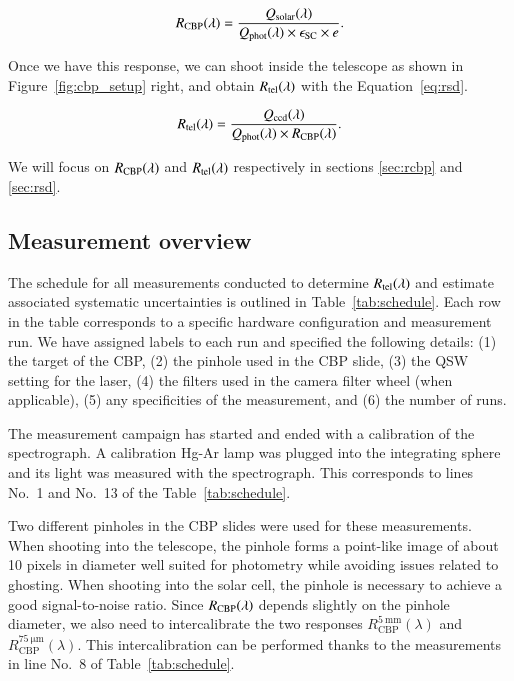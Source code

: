 \begin{equation}
    R_{\mathrm{CBP}}(\lambda) = \frac{Q_{\mathrm{solar}}(\lambda)}{Q_{\mathrm{phot}}(\lambda) \times \epsilon_{\mathrm{SC}} \times e}.
    \label{eq:rcbp}
\end{equation} 

Once we have this response, we can shoot inside the \SD telescope as shown in Figure~\ref{fig:cbp_setup} right, and obtain $R_{\mathrm{tel}}(\lambda)$ with the Equation~\ref{eq:rsd}.

\begin{equation}
    R_{\mathrm{tel}}(\lambda) = \frac{Q_{\mathrm{ccd}}(\lambda)}{Q_{\mathrm{phot}}(\lambda) \times R_{\mathrm{CBP}}(\lambda)}.
    \label{eq:rsd}
\end{equation}

We will focus on $R_{\mathrm{CBP}}(\lambda)$ and $R_{\mathrm{tel}}(\lambda)$ respectively in sections \ref{sec:rcbp} and \ref{sec:rsd}.

\subsection{Measurement overview}
\label{sec:strategy}

The schedule for all measurements conducted to determine $R_{\mathrm{tel}}(\lambda)$ and estimate associated systematic uncertainties is outlined in Table~\ref{tab:schedule}. Each row in the table corresponds to a specific hardware configuration and measurement run. We have assigned labels to each run and specified the following details: (1) the target of the CBP, (2) the pinhole used in the CBP slide, (3) the QSW setting for the laser, (4) the filters used in the \SD camera filter wheel (when applicable), (5) any specificities of the measurement, and (6) the number of runs.

The measurement campaign has started and ended with a calibration of the spectrograph. A calibration Hg-Ar lamp was plugged into the integrating sphere and its light was measured with the spectrograph. This corresponds to lines No.~1 and No.~13 of the Table~\ref{tab:schedule}.

Two different pinholes in the CBP slides were used for these measurements. When shooting into the \SD telescope, the \spinhole pinhole forms a point-like image of about 10 pixels in diameter well suited for photometry while avoiding issues related to ghosting. When shooting into the solar cell, the \bpinhole pinhole is necessary to achieve a good signal-to-noise ratio. Since $R_{\mathrm{CBP}}(\lambda)$ depends slightly on the pinhole diameter, we also need to intercalibrate the two responses $R_\mathrm{CBP}^{\mathrm{\SI{5}{\milli\meter}}} (\lambda)$ and $R_\mathrm{CBP}^{\mathrm{\SI{75}{\micro\meter}}} (\lambda)$. This intercalibration can be performed thanks to the measurements in line No.~8 of Table~\ref{tab:schedule}.


